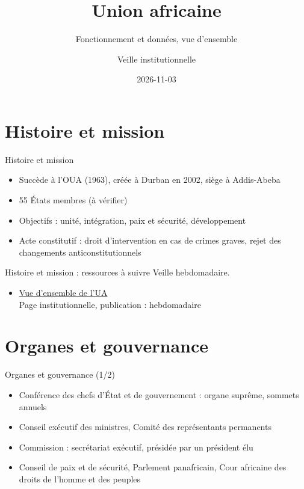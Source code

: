 \documentclass[aspectratio=169,11pt]{beamer}
\title{Union africaine}
\subtitle{Fonctionnement et données, vue d'ensemble}
\author{Veille institutionnelle}
\date{2026-11-03}
\begin{document}
\begin{frame}\titlepage\end{frame}

\section{Histoire et mission}
\begin{frame}{Histoire et mission}
\begin{itemize}
\item Succède à l'OUA (1963), créée à Durban en 2002, siège à Addis-Abeba
\item 55 États membres (à vérifier)
\item Objectifs : unité, intégration, paix et sécurité, développement
\item Acte constitutif : droit d'intervention en cas de crimes graves, rejet des changements anticonstitutionnels
\end{itemize}
\end{frame}

\begin{frame}{Histoire et mission : ressources à suivre}
\small
Veille hebdomadaire.
\begin{itemize}
\item \href{https://au.int/en/overview}{Vue d'ensemble de l'UA}\\{\footnotesize Page institutionnelle, publication : hebdomadaire}
\end{itemize}
\end{frame}

\section{Organes et gouvernance}
\begin{frame}{Organes et gouvernance (1/2)}
\begin{itemize}
\item Conférence des chefs d'État et de gouvernement : organe suprême, sommets annuels
\item Conseil exécutif des ministres, Comité des représentants permanents
\item Commission : secrétariat exécutif, présidée par un président élu
\item Conseil de paix et de sécurité, Parlement panafricain, Cour africaine des droits de l'homme et des peuples
\end{itemize}
\end{frame}
\end{document}
